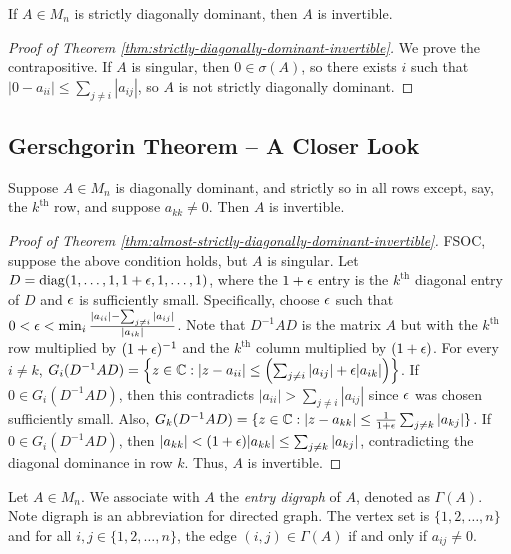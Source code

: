 \begin{theorem}
\label{thm:strictly-diagonally-dominant-invertible}
If $A \in M_n$ is strictly diagonally dominant, then $A$ is invertible.
\end{theorem}
\begin{proof}[Proof of Theorem \ref{thm:strictly-diagonally-dominant-invertible}]
We prove the contrapositive. If $A$ is singular, then $0 \in \sigma(A)$, so there exists $i$ such that $|0 - a_{ii}| \le \sum_{j\not=i} |a_{ij}|$, so $A$ is not strictly diagonally dominant.
\end{proof}

\subsection{Gerschgorin Theorem -- A Closer Look}
\begin{theorem}
\label{thm:almost-strictly-diagonally-dominant-invertible}
Suppose $A \in M_n$ is diagonally dominant, and strictly so in all rows except, say, the $k^{\text{th}}$ row, and suppose $a_{kk} \not=0$. Then $A$ is invertible.
\end{theorem}
\begin{proof}[Proof of Theorem \ref{thm:almost-strictly-diagonally-dominant-invertible}]
FSOC, suppose the above condition holds, but $A$ is singular. Let $D = \operatorname{diag}(1, \dots, 1, 1+\epsilon, 1,\dots, 1)$, where the $1+\epsilon$ entry is the $k^{\text{th}}$ diagonal entry of $D$ and $\epsilon$ is sufficiently small. Specifically, choose $\epsilon$ such that $0 < \epsilon < \min_i \frac{|a_{ii}| - \sum_{j\not=i}|a_{ij}|}{|a_{ik}|}$. Note that $D^{-1}AD$ is the matrix $A$ but with the $k^{\text{th}}$ row multiplied by $(1+\epsilon)^{-1}$ and the $k^{\text{th}}$ column multiplied by $(1+\epsilon)$. For every $i \not=k$, $G_i(D^{-1}AD) = \left\{z \in \mathbb C: |z-a_{ii}| \le \left(\sum_{j\not=i}|a_{ij}| + \epsilon|a_{ik}|\right)\right\}$. If $0 \in G_i(D^{-1}AD)$, then this contradicts $|a_{ii}| > \sum_{j\not=i}|a_{ij}|$ since $\epsilon$ was chosen sufficiently small. Also, $G_k(D^{-1}AD) = \{z \in \mathbb C: |z-a_{kk}| \le \frac{1}{1+\epsilon} \sum_{j\not=k} |a_{kj}|\}$. If $0 \in G_i(D^{-1}AD)$, then $|a_{kk}| < (1+\epsilon)|a_{kk}| \le \sum_{j\not=k}|a_{kj}|$, contradicting the diagonal dominance in row $k$. Thus, $A$ is invertible.
\end{proof}

\begin{definition}
\label{def:entry-digraph}
Let $A \in M_n$. We associate with $A$ the \textit{entry digraph} of $A$, denoted as $\Gamma(A)$. Note digraph is an abbreviation for directed graph. The vertex set is $\{1,2,\dots,n\}$ and for all $i,j \in \{1,2, \dots,n\}$, the edge $(i,j) \in \Gamma(A)$ if and only if $a_{ij} \not= 0$.
\end{definition}

